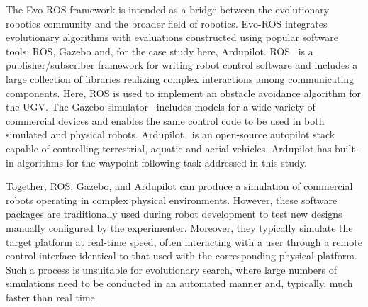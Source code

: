 The Evo-ROS framework is intended as a bridge between the evolutionary robotics community and the broader field of robotics.  
Evo-ROS integrates evolutionary algorithms with evaluations constructed using
popular software tools: ROS, Gazebo and, for the case study here, Ardupilot.
ROS~\cite{ROS.main} is a publisher/subscriber framework for writing robot control software 
and includes a large collection of libraries realizing
complex interactions among communicating components.
Here, ROS is used to implement an obstacle avoidance algorithm for the UGV.
The Gazebo simulator~\cite{Gazebo_paper_ref}
includes models for a wide variety of commercial devices and 
enables the same control code to be used in both simulated and physical robots.
Ardupilot~\cite{Ardupilot.main} is an open-source autopilot stack 
capable of controlling terrestrial, aquatic and aerial vehicles.
Ardupilot has built-in algorithms 
for the waypoint following task addressed in this study.  


Together, ROS, Gazebo, and Ardupilot can produce a simulation
of commercial robots operating in complex physical environments.
% 
% 
% 
However, these software packages are traditionally used 
during robot development to test new designs manually configured by the experimenter.
%
Moreover, they typically simulate the target platform at real-time speed,
often interacting with a user through a remote control interface identical
to that used with the corresponding physical platform.
%
% 
Such a process is unsuitable for evolutionary search, where large numbers of 
simulations need to be conducted in an automated manner and, typically, much
faster than real time.



